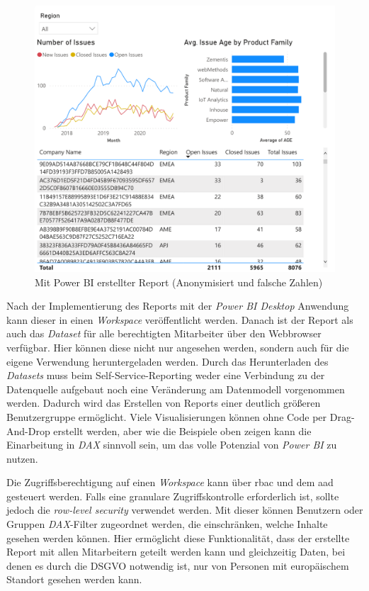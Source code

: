 \begin{figure}[htbp]
 \centering
 \includegraphics[width=\textwidth]{gfx/pbi_report.pdf}
 \caption{Mit Power BI erstellter Report (Anonymisiert und falsche Zahlen)}
\label{fig:praktischeUmsetzung:pbiRep}
\end{figure}

Nach der Implementierung des Reports mit der \textit{Power BI Desktop} Anwendung kann dieser in einen \textit{Workspace} veröffentlicht werden. Danach ist der Report als auch das \textit{Dataset} für alle berechtigten Mitarbeiter über den Webbrowser verfügbar. Hier können diese nicht nur angesehen werden, sondern auch für die eigene Verwendung heruntergeladen werden. Durch das Herunterladen des \textit{Datasets} muss beim Self-Service-Reporting weder eine Verbindung zu der Datenquelle aufgebaut noch eine Veränderung am Datenmodell vorgenommen werden. Dadurch wird das Erstellen von Reports einer deutlich größeren Benutzergruppe ermöglicht. Viele Visualisierungen können ohne Code per Drag-And-Drop erstellt werden, aber wie die Beispiele oben zeigen kann die Einarbeitung in \textit{DAX} sinnvoll sein, um das volle Potenzial von \textit{Power BI} zu nutzen.

Die Zugriffsberechtigung auf einen \textit{Workspace} kann über \ac{rbac} und dem \ac{aad} gesteuert werden. Falls eine granulare Zugriffskontrolle erforderlich ist, sollte jedoch die \textit{row-level security} verwendet werden. Mit dieser können Benutzern oder Gruppen \textit{DAX}-Filter zugeordnet werden, die einschränken, welche Inhalte gesehen werden können. Hier ermöglicht diese Funktionalität, dass der erstellte Report mit allen Mitarbeitern geteilt werden kann und gleichzeitig Daten, bei denen es durch die DSGVO notwendig ist, nur von Personen mit europäischem Standort gesehen werden kann.

